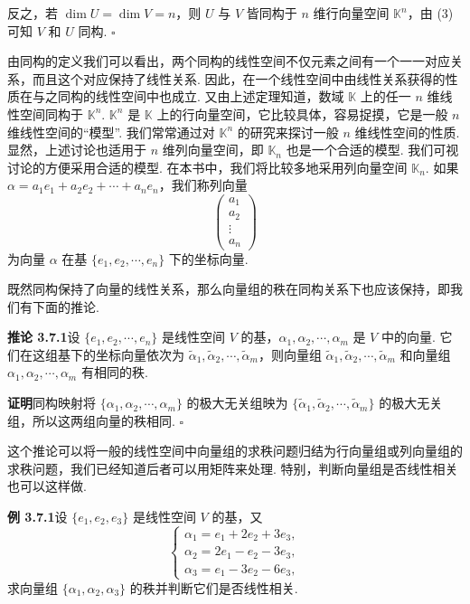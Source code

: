 \documentclass[UTF8, 12pt, fontset=fandol, oneside]{ctexart}
\begin{document}
反之，若 $\dim U=\dim V=n$，则 $U$ 与 $V$ 皆同构于 $n$ 维行向量空间 $\mathbb{K}^n$，由 (3) 可知 $V$ 和 $U$ 同构. $\square$

由同构的定义我们可以看出，两个同构的线性空间不仅元素之间有一个一一对应关系，而且这个对应保持了线性关系. 因此，在一个线性空间中由线性关系获得的性质在与之同构的线性空间中也成立. 又由上述定理知道，数域 $\mathbb{K}$ 上的任一 $n$ 维线性空间同构于 $\mathbb{K}^n$. $\mathbb{K}^n$ 是 $\mathbb{K}$ 上的行向量空间，它比较具体，容易捉摸，它是一般 $n$ 维线性空间的“模型”. 我们常常通过对 $\mathbb{K}^n$ 的研究来探讨一般 $n$ 维线性空间的性质. 显然，上述讨论也适用于 $n$ 维列向量空间，即 $\mathbb{K}_n$ 也是一个合适的模型. 我们可视讨论的方便采用合适的模型. 在本书中，我们将比较多地采用列向量空间 $\mathbb{K}_n$. 如果 $\alpha=a_1e_1+a_2e_2+\cdots+a_ne_n$，我们称列向量
\[
\left(\begin{array}{c}
a_1\\
a_2\\
\vdots\\
a_n
\end{array}\right)
\]
为向量 $\alpha$ 在基 $\{e_1,e_2,\cdots,e_n\}$ 下的坐标向量.

既然同构保持了向量的线性关系，那么向量组的秩在同构关系下也应该保持，即我们有下面的推论.

\noindent\textbf{推论 3.7.1}\quad 设 $\{e_1,e_2,\cdots,e_n\}$ 是线性空间 $V$ 的基，$\alpha_1,\alpha_2,\cdots,\alpha_m$ 是 $V$ 中的向量. 它们在这组基下的坐标向量依次为 $\widetilde{\alpha}_1,\widetilde{\alpha}_2,\cdots,\widetilde{\alpha}_m$，则向量组 $\widetilde{\alpha}_1,\widetilde{\alpha}_2,\cdots,\widetilde{\alpha}_m$ 和向量组 $\alpha_1,\alpha_2,\cdots,\alpha_m$ 有相同的秩.

\noindent\textbf{证明}\quad 同构映射将 $\{\alpha_1,\alpha_2,\cdots,\alpha_m\}$ 的极大无关组映为 $\{\widetilde{\alpha}_1,\widetilde{\alpha}_2,\cdots,\widetilde{\alpha}_m\}$ 的极大无关组，所以这两组向量的秩相同. $\square$

这个推论可以将一般的线性空间中向量组的求秩问题归结为行向量组或列向量组的求秩问题，我们已经知道后者可以用矩阵来处理. 特别，判断向量组是否线性相关也可以这样做.

\noindent\textbf{例 3.7.1}\quad 设 $\{e_1,e_2,e_3\}$ 是线性空间 $V$ 的基，又
\[
\left\{\begin{array}{l}
\alpha_1=e_1+2e_2+3e_3,\\
\alpha_2=2e_1-e_2-3e_3,\\
\alpha_3=e_1-3e_2-6e_3,
\end{array}\right.
\]
求向量组 $\{\alpha_1,\alpha_2,\alpha_3\}$ 的秩并判断它们是否线性相关.
\end{document}
